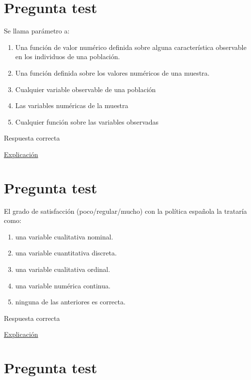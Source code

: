 \documentclass[
]{book}
\providecommand{\tightlist}{%
  \setlength{\itemsep}{0pt}\setlength{\parskip}{0pt}}
\begin{document}
\hypertarget{pregunta-test-15}{%
\section{Pregunta test}\label{pregunta-test-15}}

Se llama parámetro a:

\begin{enumerate}
\def\labelenumi{\alph{enumi})}
\tightlist
\item
  Una función de valor numérico definida sobre alguna característica observable en los individuos de una población.
\item
  Una función definida sobre los valores numéricos de una muestra.
\item
  Cualquier variable observable de una población
\item
  Las variables numéricas de la muestra
\item
  Cualquier función sobre las variables observadas
\end{enumerate}

Respuesta correcta

\href{https://1fjmanzano.github.io/bioestadistica/conceptos-previos.html}{Explicación}

\hypertarget{pregunta-test-16}{%
\section{Pregunta test}\label{pregunta-test-16}}

El grado de satisfacción (poco/regular/mucho) con la política española la trataría como:

\begin{enumerate}
\def\labelenumi{\alph{enumi})}
\tightlist
\item
  una variable cualitativa nominal.
\item
  una variable cuantitativa discreta.
\item
  una variable cualitativa ordinal.
\item
  una variable numérica continua.
\item
  ninguna de las anteriores es correcta.
\end{enumerate}

Respuesta correcta

\href{https://1fjmanzano.github.io/bioestadistica/tipos-de-variables.html}{Explicación}

\hypertarget{pregunta-test-17}{%
\section{Pregunta test}\label{pregunta-test-17}}
\end{document}
